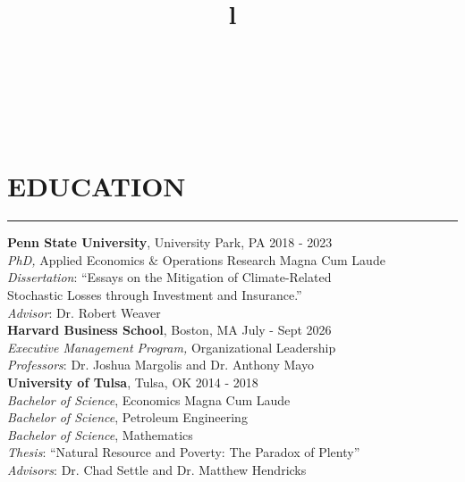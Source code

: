 \documentclass[overlapped]{res}
\begin{document}
\begin{resume}
\begin{format}
\title{l}\\
\\
\body\\
\end{format}
\section{EDUCATION}
\vspace{-3 mm}
\noindent\rule{\textwidth}{1pt}
\textbf{Penn State University}, University Park, PA \hfill 2018 - 2023\\
{\sl PhD,} Applied Economics $\&$ Operations Research \hfill {Magna Cum Laude}\\
{\sl Dissertation}: \enquote{Essays on the Mitigation of Climate-Related \\ Stochastic Losses through Investment and Insurance.}
\\
{\sl Advisor}: Dr. Robert Weaver\\[2mm]
\textbf{Harvard Business School}, Boston, MA \hfill July - Sept 2026\\
{\sl Executive Management Program,} Organizational Leadership \\
{\sl Professors}: Dr. Joshua Margolis and Dr. Anthony Mayo
\\[2mm]
\textbf{University of Tulsa}, Tulsa, OK \hfill 2014 - 2018\\
{\sl Bachelor of Science}, Economics \hfill Magna Cum Laude\\
{\sl Bachelor of Science}, Petroleum Engineering \\
{\sl Bachelor of Science}, Mathematics
\\
{\sl Thesis}: \enquote{Natural Resource and Poverty: The Paradox of Plenty}
\\
{\sl Advisors}: Dr. Chad Settle and Dr. Matthew Hendricks
\vspace{0 mm}
\vspace{0 mm}

\end{resume}
\end{document}
